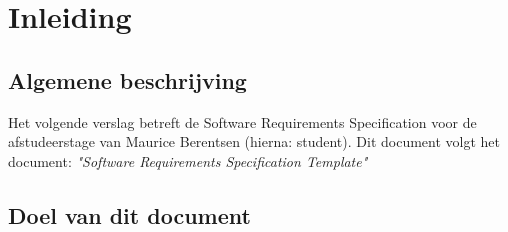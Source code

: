 \documentclass[a4paper, 11pt, oneside]{report}
\begin{document}

\tableofcontents
\clearpage







\chapter{Inleiding}
\label{inleiding}
\section{Algemene beschrijving}
\label{inleiding:beschrijving}
Het volgende verslag betreft de Software Requirements Specification voor de afstudeerstage van Maurice Berentsen (hierna: student).
Dit document volgt het document: \textit{"Software Requirements Specification Template"} \cite{template:srs}
 

\section{Doel van dit document}
\label{inleiding:doelvanditdoucment}
\end{document}
